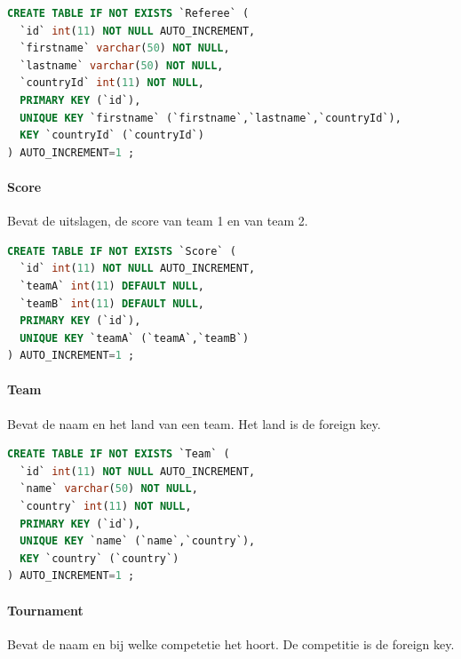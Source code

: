 \documentclass[11pt]{article}
\begin{document}
        \begin{framed}
        \begin{lstlisting}[language=sql]
CREATE TABLE IF NOT EXISTS `Referee` (
  `id` int(11) NOT NULL AUTO_INCREMENT,
  `firstname` varchar(50) NOT NULL,
  `lastname` varchar(50) NOT NULL,
  `countryId` int(11) NOT NULL,
  PRIMARY KEY (`id`),
  UNIQUE KEY `firstname` (`firstname`,`lastname`,`countryId`),
  KEY `countryId` (`countryId`)
) AUTO_INCREMENT=1 ;
        \end{lstlisting}
        \end{framed}
        
        
        
        
    \paragraph{Score}
        Bevat de uitslagen, de score van team 1 en van team 2.
        
        \begin{framed}
        \begin{lstlisting}[language=sql]
CREATE TABLE IF NOT EXISTS `Score` (
  `id` int(11) NOT NULL AUTO_INCREMENT,
  `teamA` int(11) DEFAULT NULL,
  `teamB` int(11) DEFAULT NULL,
  PRIMARY KEY (`id`),
  UNIQUE KEY `teamA` (`teamA`,`teamB`)
) AUTO_INCREMENT=1 ;
        \end{lstlisting}
        \end{framed}
        
        
        
    
    \paragraph{Team}
        Bevat de naam en het land van een team.
        Het land is de foreign key.
        
        \begin{framed}
        \begin{lstlisting}[language=sql]
CREATE TABLE IF NOT EXISTS `Team` (
  `id` int(11) NOT NULL AUTO_INCREMENT,
  `name` varchar(50) NOT NULL,
  `country` int(11) NOT NULL,
  PRIMARY KEY (`id`),
  UNIQUE KEY `name` (`name`,`country`),
  KEY `country` (`country`)
) AUTO_INCREMENT=1 ;
        \end{lstlisting}
        \end{framed}
        
        
        
        
    \paragraph{Tournament}
        Bevat de naam en bij welke competetie het hoort.
        De competitie is de foreign key.
        
\end{document}
